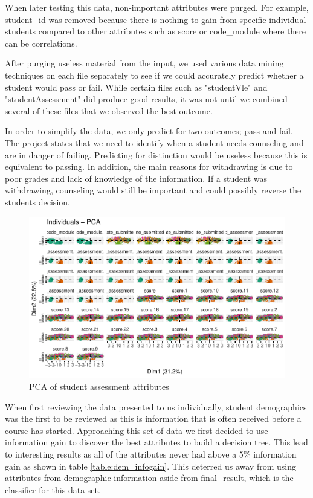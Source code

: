 \documentclass[12pt]{article}
\begin{document}
 When later testing this data, non-important attributes were purged. For example, student\_id was removed because there is nothing to gain from specific individual students compared to other attributes such as score or code\_module where there can be correlations.

 After purging useless material from the input, we used various data mining techniques on each file separately to see if we could accurately predict whether a student would pass or fail. While certain files such as "studentVle" and "studentAssessment" did produce good results, it was not until we combined several of these files that we observed the best outcome.  
 
 In order to simplify the data, we only predict for two outcomes; pass and fail. The project states that we need to identify when a student needs counseling and are in danger of failing. Predicting for distinction would be useless because this is equivalent to passing. In addition, the main reasons for withdrawing is due to poor grades and lack of knowledge of the information. If a student was withdrawing, counseling would still be important and could possibly reverse the students decision.

\begin{figure}[h]
 \centering
 \includegraphics[scale=0.8]{PCA_Assessments_first50.pdf}
 \caption{PCA of student assessment attributes}
 \label{fig:pca}
 \end{figure}
 
 When first reviewing the data presented to us individually, student demographics was the first to be reviewed as this is information that is often received before a course has started. Approaching this set of data we first decided to use information gain to discover the best attributes to build a decision tree. This lead to interesting results as all of the attributes never had above a 5\% information gain as shown in table \ref{table:dem_infogain}. This deterred us away from using attributes from demographic information aside from final\_result, which is the classifier for this data set.
 
\end{document}
